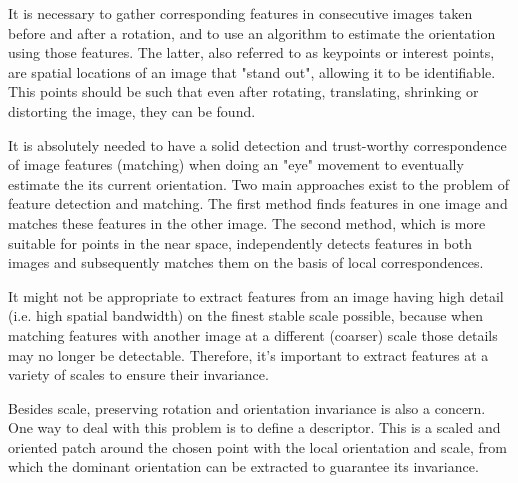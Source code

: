 It is necessary to gather corresponding features in consecutive images taken before and after a rotation, and to use an algorithm to estimate the orientation using those features. The latter, also referred to as keypoints or interest points, are spatial locations of an image that "stand out", allowing it to be identifiable. This points should be such that even after rotating, translating, shrinking or distorting the image, they can be found.

It is absolutely needed to have a solid detection and trust-worthy correspondence of image features (matching) when doing an "eye" movement to eventually estimate the its current orientation. Two main approaches exist to the problem of feature detection and matching. The first method finds features in one image and matches these features in the other image. The second method, which is more suitable for points in the near space, independently detects features in both images and subsequently matches them on the basis of local correspondences.

It might not be appropriate to extract features from an image having high detail (i.e. high spatial bandwidth) on the finest stable scale possible, because when matching features with another image at a different (coarser) scale those details may no longer be detectable. Therefore, it's important to extract features at a variety of scales to ensure their invariance. 

Besides scale, preserving rotation and orientation invariance is also a concern. One way to deal with this problem is to define a descriptor. This is a scaled and oriented patch around the chosen point with the local orientation and scale, from which the dominant orientation can be extracted to guarantee its invariance. \cite{multiview}

